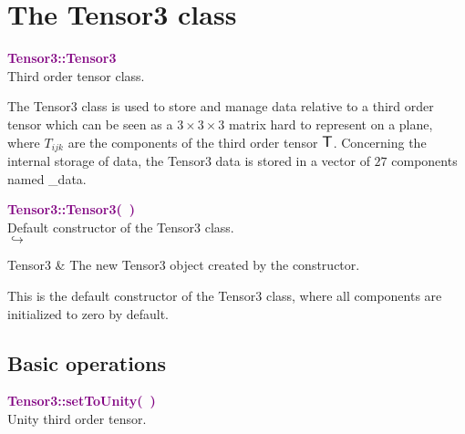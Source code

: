 \section{The Tensor3 class}

\textcolor{purple}{\textbf{Tensor3::Tensor3}}\label{Tensor3::Tensor3}\\
Third order tensor class.

The Tensor3 class is used to store and manage data relative to a third order tensor which can be seen as a $3\times3\times3$ matrix hard to represent on a plane,
where $T_{ijk}$ are the components of the third order tensor $\mbox{\large\ensuremath{\mathsf{T}}}$.
Concerning the internal storage of data, the Tensor3 data is stored in a vector of $27$ components named \textsf{\_data}.



\textcolor{purple}{\textbf{Tensor3::Tensor3(~)}}\label{Tensor3::Tensor3()}\\
Default constructor of the Tensor3 class.\\ \hspace*{5mm}$\hookrightarrow$
\vspace*{-2em}\begin{tcolorbox}[grow to left by=-1cm, width=\textwidth-1cm,myArgs,tabularx={l|R}]
Tensor3 & The new Tensor3 object created by the constructor.
\end{tcolorbox}

This is the default constructor of the Tensor3 class, where all components are initialized to zero by default.

\subsection{Basic operations}

\textcolor{purple}{\textbf{Tensor3::setToUnity(~)}}\label{Tensor3::setToUnity()}\\
Unity third order tensor.

